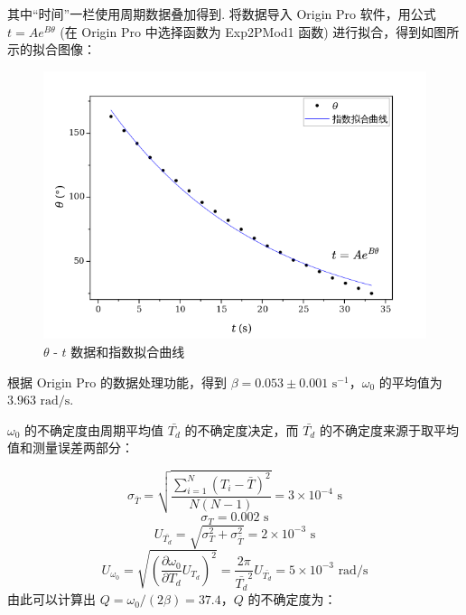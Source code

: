 \documentclass{THUexprep}
\begin{document}
其中“时间”一栏使用周期数据叠加得到. 将数据导入 Origin Pro 软件，用公式 $t=Ae^{B\theta}$ (在 Origin Pro 中选择函数为 Exp2PMod1 函数) 进行拟合，得到如图所示的拟合图像：

\begin{figure}[h]
    \centering
    \includegraphics[scale=0.5]{exp.png}
    \caption{$\mathit{\theta}$ - $\mathit{t}$ 数据和指数拟合曲线}
    \label{fig:exp}
\end{figure}

根据 Origin Pro 的数据处理功能，得到 $\beta=0.053\pm0.001\text{ s}^{-1}$，$\omega_0$ 的平均值为 $3.963\text{ rad/s}$.

$\omega_0$ 的不确定度由周期平均值 $\bar{T_d}$ 的不确定度决定，而 $\bar{T_d}$ 的不确定度来源于取平均值和测量误差两部分：

\begin{equation}
    \sigma_{\bar{T}} = \sqrt{\frac{\sum_{i=1}^{N}(T_i-\bar{T})^2}{N(N-1)}} = 3\times10^{-4}\text{ s}
\end{equation}
\begin{equation}
    \sigma_T = 0.002\text{ s}
\end{equation}
\begin{equation}
    U_{\bar{T_d}} = \sqrt{\sigma_T^2+\sigma_{\bar{T}}^2} = 2\times10^{-3}\text{ s}
\end{equation}
\begin{equation}
    U_{\omega_0} = \sqrt{\left(\frac{\partial \omega_0}{\partial T_d}U_{T_d}\right)^2} = \frac{2\pi}{\bar{T_d}^2}U_{\bar{T_d}} = 5\times10^{-3}\text{ rad/s}
\end{equation}
\newline
由此可以计算出 $Q=\omega_0/(2\beta)=37.4$，$Q$ 的不确定度为：
\end{document}
